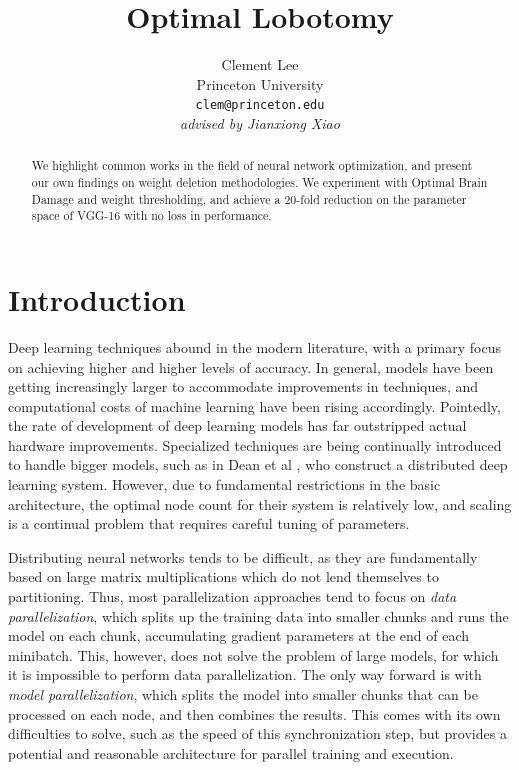 \documentclass[10pt,twocolumn,letterpaper]{article}
\begin{document}
\title{Optimal Lobotomy}

\author{Clement Lee\\
Princeton University\\
{\tt\small clem@princeton.edu}\\
\emph{advised by Jianxiong Xiao}
}
\maketitle

\begin{abstract}
  We highlight common works in the field of neural network optimization, and present our own findings on weight deletion methodologies.
  We experiment with Optimal Brain Damage and weight thresholding, and achieve a 20-fold reduction on the parameter space of VGG-16 with no loss in performance.
  
\end{abstract}

\section{Introduction}

Deep learning techniques abound in the modern literature, with a primary focus on achieving higher and higher levels of accuracy.
In general, models have been getting increasingly larger to accommodate improvements in techniques, and computational costs of machine learning have been rising accordingly.
Pointedly, the rate of development of deep learning models has far outstripped actual hardware improvements.
Specialized techniques are being continually introduced to handle bigger models, such as in Dean et al \cite{dean2012large}, who construct a distributed deep learning system.
However, due to fundamental restrictions in the basic architecture, the optimal node count for their system is relatively low, and scaling is a continual problem that requires careful tuning of parameters.

Distributing neural networks tends to be difficult, as they are fundamentally based on large matrix multiplications which do not lend themselves to partitioning.
Thus, most parallelization approaches tend to focus on \emph{data parallelization}, which splits up the training data into smaller chunks and runs the model on each chunk, accumulating gradient parameters at the end of each minibatch.
This, however, does not solve the problem of large models, for which it is impossible to perform data parallelization.
The only way forward is with \emph{model parallelization}, which splits the model into smaller chunks that can be processed on each node, and then combines the results.
This comes with its own difficulties to solve, such as the speed of this synchronization step, but provides a potential and reasonable architecture for parallel training and execution.
\end{document}
